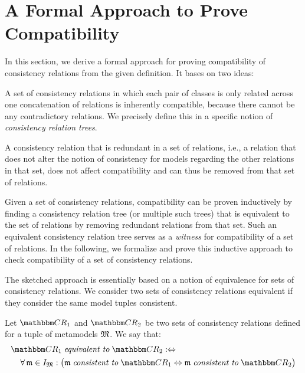 \section{A Formal Approach to Prove Compatibility}
\label{chap:compatibility:formal_approach}

In this section, we derive a formal approach for proving compatibility of consistency relations from the given definition.
It bases on two ideas:
\begin{longenumerate}
    \item A set of consistency relations in which each pair of classes is only related across one concatenation of relations is inherently compatible, because there cannot be any contradictory relations. We precisely define this in a specific notion of \emph{consistency relation trees}.
    \item A consistency relation that is redundant in a set of relations, i.e., a relation that does not alter the notion of consistency for models regarding the other relations in that set, does not affect compatibility and can thus be removed from that set of relations.
\end{longenumerate}
Given a set of consistency relations, compatibility can be proven inductively by finding a consistency relation tree (or multiple such trees) that is equivalent to the set of relations by removing redundant relations from that set.
Such an equivalent consistency relation tree serves as a \emph{witness} for compatibility of a set of relations.
In the following, we formalize and prove this inductive approach to check compatibility of a set of consistency relations.

The sketched approach is essentially based on a notion of equivalence for sets of consistency relations.
We consider two sets of consistency relations equivalent if they consider the same model tuples consistent.

\begin{definition}
\label{def:equivalence}
    Let $\consistencyrelationset{CR}_{1}$ and $\consistencyrelationset{CR}_{2}$ be two sets of consistency relations defined for a tuple of metamodels $\metamodeltuple{M}$.
    We say that:
    \begin{align*}
        &
        \consistencyrelationset{CR}_{1} \equivalenttomath \consistencyrelationset{CR}_{2} \equivalentperdefinition \\
        & \formulaskip
        \forall \modeltuple{m} \in \metamodeltupleinstanceset{M} :
        \big(
            \modeltuple{m} \consistenttomath \consistencyrelationset{CR}_{1} \equivalent \modeltuple{m} \consistenttomath \consistencyrelationset{CR}_{2}
        \big)
    \end{align*}
\end{definition}

